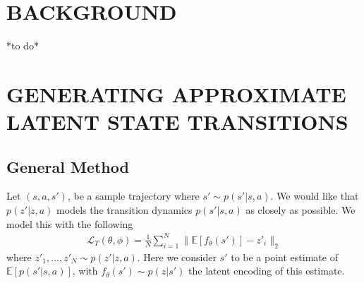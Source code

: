 \documentclass[letterpaper, 10 pt, conference]{ieeeconf}  %
\begin{document}
\section{BACKGROUND}
*to do*

\section{GENERATING APPROXIMATE LATENT STATE TRANSITIONS}

\subsection{General Method}


Let $(s, a, s')$, be a sample trajectory where $s'\sim p(s'|s,a)$. We would like that $p(z'|z,a)$ models the transition dynamics $p(s'|s,a)$ as closely as possible. We model this with the following
\begin{align*}
	\mathcal{L}_T(\theta, \phi) = \frac{1}{N}\sum_{i=1}^N \|\mathbb{E}[f_\theta(s')] - z'_i\|_2
\end{align*}
where $z'_1,...,z'_N \sim p(z'|z,a)$. Here we consider $s'$ to be a point estimate of $\mathbb{E}[p(s'|s,a)]$, with $f_\theta(s') \sim p(z|s')$ the latent encoding of this estimate.
\end{document}
